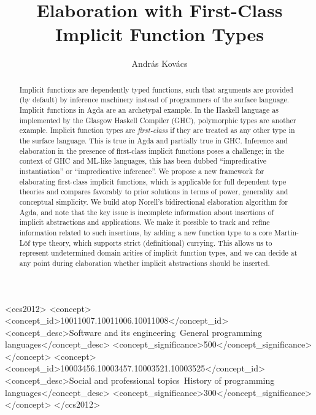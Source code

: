 \documentclass[acmsmall,review,anonymous,prologue,dvipsnames]{acmart}\settopmatter{printfolios=true,printccs=false,printacmref=false}
\begin{document}
\title{Elaboration with First-Class Implicit Function Types}


\author{Andr{\'a}s Kov{\'a}cs}


\begin{abstract}
Implicit functions are dependently typed functions, such that arguments are
provided (by default) by inference machinery instead of programmers of the
surface language. Implicit functions in Agda are an archetypal example. In the
Haskell language as implemented by the Glasgow Haskell Compiler (GHC),
polymorphic types are another example. Implicit function types are
\emph{first-class} if they are treated as any other type in the surface
language. This is true in Agda and partially true in GHC. Inference and
elaboration in the presence of first-class implicit functions poses a challenge;
in the context of GHC and ML-like languages, this has been dubbed
``impredicative instantiation'' or ``impredicative inference''. We propose a new
framework for elaborating first-class implicit functions, which is applicable
for full dependent type theories and compares favorably to prior solutions in
terms of power, generality and conceptual simplicity. We build atop Norell's
bidirectional elaboration algorithm for Agda, and note that the key issue is
incomplete information about insertions of implicit abstractions and
applications. We make it possible to track and refine information related to
such insertions, by adding a new function type to a core Martin-L\"of type
theory, which supports strict (definitional) currying. This allows us to
represent undetermined domain arities of implicit function types, and we can
decide at any point during elaboration whether implicit abstractions should be
inserted.
\end{abstract}


\begin{CCSXML}
<ccs2012>
<concept>
<concept_id>10011007.10011006.10011008</concept_id>
<concept_desc>Software and its engineering~General programming languages</concept_desc>
<concept_significance>500</concept_significance>
</concept>
<concept>
<concept_id>10003456.10003457.10003521.10003525</concept_id>
<concept_desc>Social and professional topics~History of programming languages</concept_desc>
<concept_significance>300</concept_significance>
</concept>
</ccs2012>
\end{CCSXML}
\end{document}
